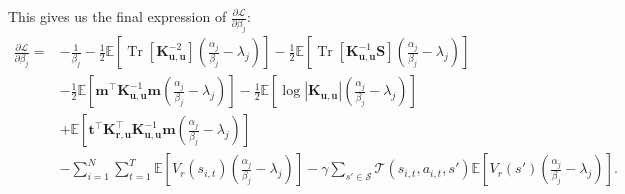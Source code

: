 \documentclass{article}
\theoremstyle{definition}
\DeclareMathOperator{\Tr}{Tr}
\newcommand{\Kuu}{\mathbf{K}_{\mathbf{u},\mathbf{u}}}
\newcommand{\Kru}{\mathbf{K}_{\mathbf{r},\mathbf{u}}}
\begin{document}
This gives us the final expression of $\frac{\partial\mathcal{L}}{\partial\beta_j}$:
\[
  \begin{split}
    \frac{\partial\mathcal{L}}{\partial\beta_j} = &- \frac{1}{\beta_j} -
    \frac{1}{2}\mathbb{E} \left[ \Tr[\Kuu^{-2}] \left( \frac{\alpha_j}{\beta_j}
        - \lambda_j \right) \right] - \frac{1}{2}\mathbb{E} \left[
      \Tr[\Kuu^{-1}\mathbf{S}] \left(\frac{\alpha_j}{\beta_j} - \lambda_j
      \right) \right] \\
    &- \frac{1}{2}\mathbb{E} \left[ \mathbf{m}^\intercal\Kuu^{-1}\mathbf{m}
      \left(\frac{\alpha_j}{\beta_j} - \lambda_j \right) \right] -
    \frac{1}{2}\mathbb{E} \left[ \log|\Kuu| \left(\frac{\alpha_j}{\beta_j} -
        \lambda_j \right) \right] \\
    &+ \mathbb{E} \left[ \mathbf{t}^\intercal\Kru^\intercal\Kuu^{-1}\mathbf{m}
      \left(\frac{\alpha_j}{\beta_j} - \lambda_j \right) \right] \\
    &- \sum_{i=1}^N \sum_{t=1}^T \mathbb{E} \left[ V_r(s_{i,t})
      \left(\frac{\alpha_j}{\beta_j} - \lambda_j \right) \right] -
    \gamma\sum_{s' \in \mathcal{S}} \mathcal{T}(s_{i,t}, a_{i,t}, s')\mathbb{E}
    \left[V_r(s') \left(\frac{\alpha_j}{\beta_j} - \lambda_j \right) \right].
  \end{split}
\]



\end{document}
